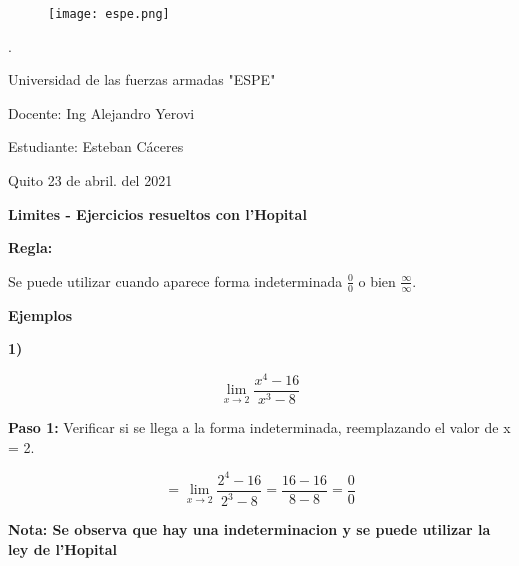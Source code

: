 \documentclass[12pt,a4paper]{article}
\begin{document}
\begin{figure}
\texttt{[image: espe.png]}
\end{figure}

\begin{center}

\vspace{2cm}
.
\vspace{2cm}

Universidad de las fuerzas armadas "ESPE"

\vspace{7cm}
\end{center}
\raggedright{Docente: Ing Alejandro Yerovi}

\vspace{0.5cm}

\raggedright{Estudiante: Esteban Cáceres}

\vspace{5.5cm}

Quito 23 de abril. del 2021
\newpage

\centering \textbf{Limites - Ejercicios resueltos con l'Hopital
}

\vspace{0.5cm}

\raggedright \textbf{Regla:}

\vspace{0.2cm}

\raggedright Se puede utilizar cuando aparece forma indeterminada $\frac{0}{0}$ o bien $\frac{\infty}{\infty}$.

\vspace{0.5cm}

\textbf{Ejemplos}

\vspace{0.2cm}


\textbf{1)}

\[
\lim_{x \to 2} \frac{x^4 -16}{x^3 - 8} 
\]

\vspace{0.2cm}

\textbf{Paso 1:}
\vspace{0.2cm}
Verificar si se llega a la forma indeterminada, reemplazando el valor de x = 2.

\[
= \lim_{x \to 2} \frac{2^4 -16}{2^3 - 8}=  \frac{16 - 16}{8 - 8}= \frac{0}{0}
\]

\vspace{0.2cm}

\textbf{Nota: Se observa que hay una indeterminacion y se puede utilizar la ley de l'Hopital }
\end{document}
